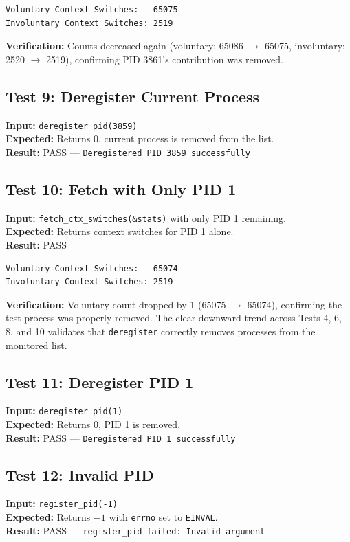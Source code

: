 \documentclass[12pt,a4paper]{article}
\begin{document}
\begin{lstlisting}
Voluntary Context Switches:   65075
Involuntary Context Switches: 2519
\end{lstlisting}

\textbf{Verification:} Counts decreased again (voluntary: 65086 $\rightarrow$ 65075, involuntary: 2520 $\rightarrow$ 2519), confirming PID 3861's contribution was removed.

\subsection*{Test 9: Deregister Current Process}
\textbf{Input:} \texttt{deregister\_pid(3859)} \\
\textbf{Expected:} Returns 0, current process is removed from the list. \\
\textbf{Result:} PASS --- \texttt{Deregistered PID 3859 successfully}

\subsection*{Test 10: Fetch with Only PID 1}
\textbf{Input:} \texttt{fetch\_ctx\_switches(\&stats)} with only PID 1 remaining. \\
\textbf{Expected:} Returns context switches for PID 1 alone. \\
\textbf{Result:} PASS

\begin{lstlisting}
Voluntary Context Switches:   65074
Involuntary Context Switches: 2519
\end{lstlisting}

\textbf{Verification:} Voluntary count dropped by 1 (65075 $\rightarrow$ 65074), confirming the test process was properly removed. The clear downward trend across Tests 4, 6, 8, and 10 validates that \texttt{deregister} correctly removes processes from the monitored list.

\subsection*{Test 11: Deregister PID 1}
\textbf{Input:} \texttt{deregister\_pid(1)} \\
\textbf{Expected:} Returns 0, PID 1 is removed. \\
\textbf{Result:} PASS --- \texttt{Deregistered PID 1 successfully}

\subsection*{Test 12: Invalid PID}
\textbf{Input:} \texttt{register\_pid(-1)} \\
\textbf{Expected:} Returns $-1$ with \texttt{errno} set to \texttt{EINVAL}. \\
\textbf{Result:} PASS --- \texttt{register\_pid failed: Invalid argument}
\end{document}
